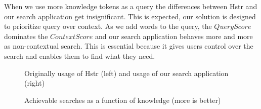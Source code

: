 When we use more knowledge tokens as a query the differences between Hstr and our search application get insignificant. This is expected, our solution is designed to prioritize query over context. As we add words to the query, the \(QueryScore\) dominates the \(ContextScore\) and our search application behaves more and more as non-contextual search. This is essential because it gives users control over the search and enables them to find what they need.



\begin{figure}[h!]
\centering
{}\hfill
{}
\caption{Achievable searches as a function of knowledge (more is better)}
\small{Originally usage of Hstr (left) and usage of our search application (right)}
\label{eval-metrics-plot-cmds}
\end{figure}

